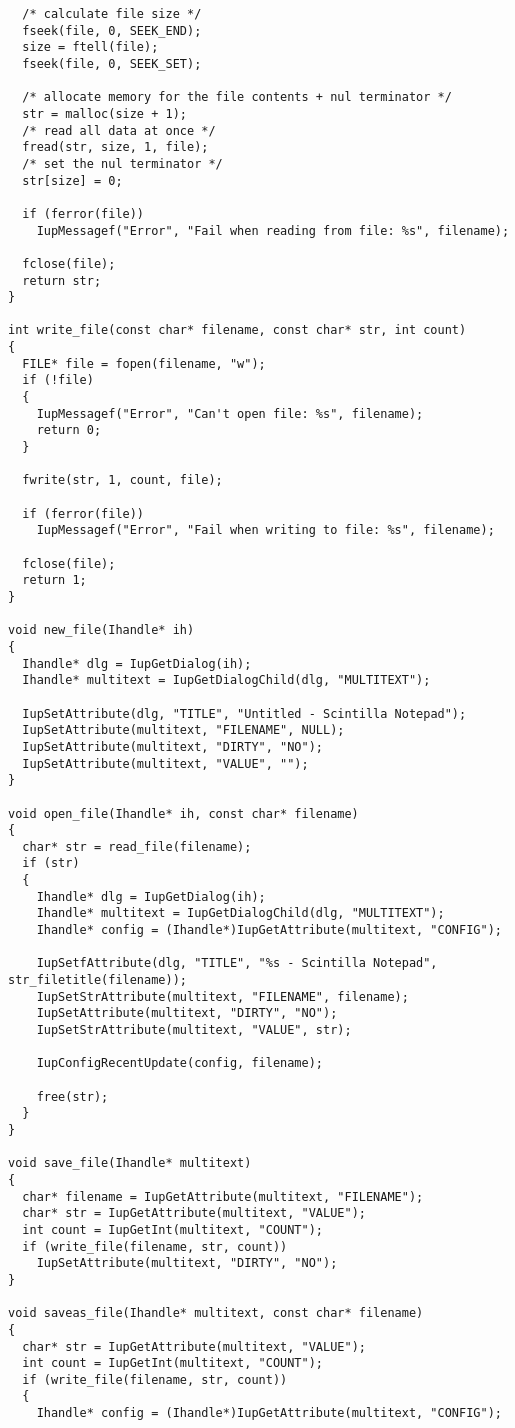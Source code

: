 \documentclass{ctexart}
\begin{document}
\begin{lstlisting}
  /* calculate file size */
  fseek(file, 0, SEEK_END);
  size = ftell(file);
  fseek(file, 0, SEEK_SET);

  /* allocate memory for the file contents + nul terminator */
  str = malloc(size + 1);
  /* read all data at once */
  fread(str, size, 1, file);
  /* set the nul terminator */
  str[size] = 0;

  if (ferror(file))
    IupMessagef("Error", "Fail when reading from file: %s", filename);

  fclose(file);
  return str;
}

int write_file(const char* filename, const char* str, int count)
{
  FILE* file = fopen(filename, "w");
  if (!file)
  {
    IupMessagef("Error", "Can't open file: %s", filename);
    return 0;
  }

  fwrite(str, 1, count, file);

  if (ferror(file))
    IupMessagef("Error", "Fail when writing to file: %s", filename);

  fclose(file);
  return 1;
}

void new_file(Ihandle* ih)
{
  Ihandle* dlg = IupGetDialog(ih);
  Ihandle* multitext = IupGetDialogChild(dlg, "MULTITEXT");

  IupSetAttribute(dlg, "TITLE", "Untitled - Scintilla Notepad");
  IupSetAttribute(multitext, "FILENAME", NULL);
  IupSetAttribute(multitext, "DIRTY", "NO");
  IupSetAttribute(multitext, "VALUE", "");
}

void open_file(Ihandle* ih, const char* filename)
{
  char* str = read_file(filename);
  if (str)
  {
    Ihandle* dlg = IupGetDialog(ih);
    Ihandle* multitext = IupGetDialogChild(dlg, "MULTITEXT");
    Ihandle* config = (Ihandle*)IupGetAttribute(multitext, "CONFIG");

    IupSetfAttribute(dlg, "TITLE", "%s - Scintilla Notepad", str_filetitle(filename));
    IupSetStrAttribute(multitext, "FILENAME", filename);
    IupSetAttribute(multitext, "DIRTY", "NO");
    IupSetStrAttribute(multitext, "VALUE", str);

    IupConfigRecentUpdate(config, filename);

    free(str);
  }
}

void save_file(Ihandle* multitext)
{
  char* filename = IupGetAttribute(multitext, "FILENAME");
  char* str = IupGetAttribute(multitext, "VALUE");
  int count = IupGetInt(multitext, "COUNT");
  if (write_file(filename, str, count))
    IupSetAttribute(multitext, "DIRTY", "NO");
}

void saveas_file(Ihandle* multitext, const char* filename)
{
  char* str = IupGetAttribute(multitext, "VALUE");
  int count = IupGetInt(multitext, "COUNT");
  if (write_file(filename, str, count))
  {
    Ihandle* config = (Ihandle*)IupGetAttribute(multitext, "CONFIG");


\end{lstlisting}
\end{document}
